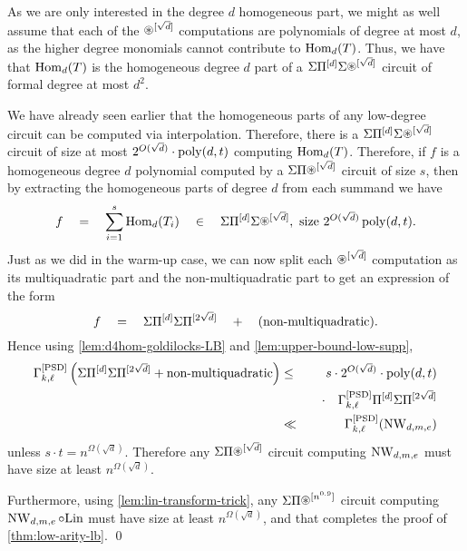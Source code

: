 As we are only interested in the degree $d$ homogeneous part, we might as well assume that each of the $\circast^{[\sqrt{d}]}$ computations are polynomials of degree at most $d$, as the higher degree monomials cannot contribute to $\operatorname{Hom}_d(T)$. Thus, we have that $\operatorname{Hom}_d(T)$ is the homogeneous degree $d$ part of a  $\Sigma\Pi^{[d]}\Sigma\circast^{[\sqrt{d}]}$ circuit of formal degree at most $d^2$. 

We have already seen earlier that the homogeneous parts of any low-degree circuit can be computed via interpolation.
Therefore, there is a $\Sigma\Pi^{[d]}\Sigma\circast^{[\sqrt{d}]}$ circuit of size at most $2^{O(\sqrt{d})} \cdot \operatorname{poly}(d,t)$ computing $\operatorname{Hom}_d(T)$. Therefore, if $f$ is a homogeneous degree $d$ polynomial computed by a $\SPA^{[\sqrt{d}]}$ circuit of size $s$, then by extracting the homogeneous parts of degree $d$ from each summand we have 
\[
f \spaced{=} \sum_{i=1}^s \Hom_d(T_i) \spaced{\in} \Sigma\Pi^{[d]}\Sigma\circast^{[\sqrt{d}]},\text{ size $2^{O(\sqrt{d})} \poly(d,t)$}.
\]
Just as we did in the warm-up case, we can now split each $\circast^{[\sqrt{d}]}$ computation as its multiquadratic part and the non-multiquadratic part to get an expression of the form
\[
f \quad = \quad \Sigma\Pi^{[d]}\Sigma\Pi^{[2\sqrt{d}]}  \quad + \quad (\text{non-multiquadratic}).
\]
Hence using \autoref{lem:d4hom-goldilocks-LB} and \autoref{lem:upper-bound-low-supp}, 
\begin{eqnarray*}
\Gamma^{\mathrm{[PSD]}}_{k,\ell}\left(\Sigma\Pi^{[d]}\Sigma\Pi^{[2\sqrt{d}]} + \text{non-multiquadratic}\right) &\leq & s\cdot 2^{O(\sqrt{d})} \cdot \operatorname{poly}(d,t)\\
& & \quad \cdot \quad \Gamma^{\mathrm{[PSD]}}_{k,\ell}{\Pi^{[d]}\Sigma\Pi^{[2\sqrt{d}]}}\\
& \ll & \Gamma^{\mathrm{[PSD]}}_{k,\ell}(\operatorname{\mathrm{NW}}_{d,m,e})
\end{eqnarray*}
unless $s \cdot t = n^{\Omega(\sqrt{d})}$. Therefore any $\SPA^{[\sqrt{d}]}$ circuit computing $\operatorname{\mathrm{NW}}_{d,m,e}$ must have size at least $n^{\Omega(\sqrt{d})}$.

Furthermore, using \autoref{lem:lin-transform-trick}, any $\SPA^{[n^{0.9}]}$ circuit computing $\operatorname{\mathrm{NW}}_{d,m,e} \circ \mathrm{Lin}$ must have size at least $n^{\Omega(\sqrt{d})}$, and that completes the proof of \autoref{thm:low-arity-lb}. \qed




